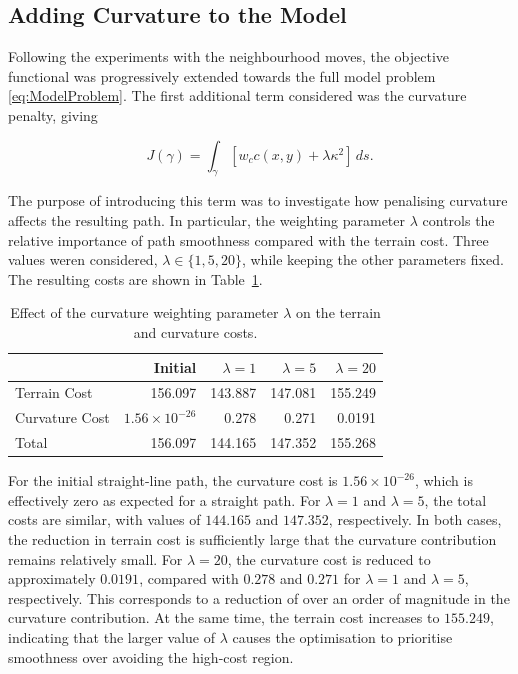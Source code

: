 \subsection{Adding Curvature to the Model}
\label{subsec:adding_curvature} 

Following the experiments with the neighbourhood moves, the objective functional was progressively extended towards the full model problem \eqref{eq:ModelProblem}. The first additional term considered was the curvature penalty, giving

\[
J(\gamma)
=
\int_\gamma
\left[
w_c c(x,y)
+
\lambda\kappa^2
\right]\,ds.
\]

The purpose of introducing this term was to investigate how penalising curvature affects the resulting path. In particular, the weighting parameter $\lambda$ controls the relative importance of path smoothness compared with the terrain cost. Three values weren considered, $\lambda\in\{1,5,20\}$, while keeping the other parameters fixed. The resulting costs are shown in Table~\ref{tab:lambda_results}.

\begin{table}[H]
    \centering
    \caption{Effect of the curvature weighting parameter $\lambda$ on
    the terrain and curvature costs.}
    \label{tab:lambda_results}
    \begin{tabular}{lrrrr}
        \hline
        & Initial & $\lambda=1$ & $\lambda=5$ & $\lambda=20$ \\
        \hline
        Terrain Cost
        & 156.097 & 143.887 & 147.081 & 155.249 \\
        
        Curvature Cost
        & $1.56\times10^{-26}$ & 0.278 & 0.271 & 0.0191 \\
        
        Total
        & 156.097 & 144.165 & 147.352 & 155.268 \\
        \hline
    \end{tabular}
\end{table}

For the initial straight-line path, the curvature cost is $1.56\times10^{-26}$, which is effectively zero as expected for a straight path. For $\lambda=1$ and $\lambda=5$, the total costs are  similar, with values of $144.165$ and $147.352$, respectively. In both cases, the reduction in terrain cost is sufficiently large that the curvature contribution remains relatively small. For $\lambda=20$, the curvature cost is reduced to approximately $0.0191$, compared with $0.278$ and $0.271$ for $\lambda=1$ and $\lambda=5$, respectively. This corresponds to a reduction of over an order of magnitude in the curvature contribution. At the same time, the terrain cost increases to $155.249$, indicating that the larger value of $\lambda$ causes the optimisation to prioritise smoothness over avoiding the high-cost region.

